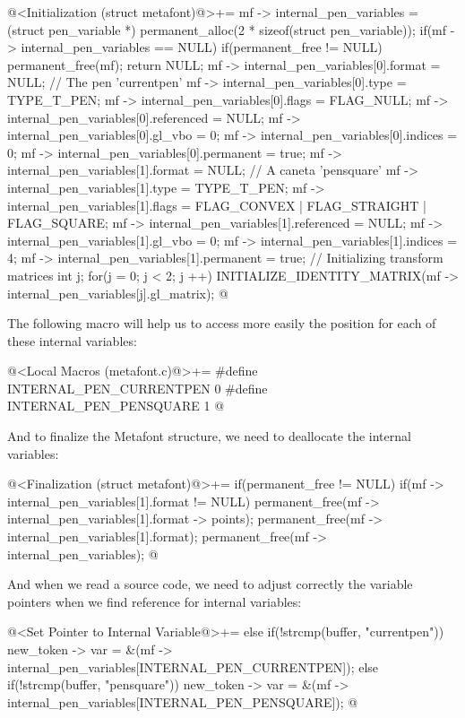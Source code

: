 \iniciocodigo
@<Initialization (struct metafont)@>+=
mf -> internal_pen_variables = (struct pen_variable *)
                                 permanent_alloc(2 * sizeof(struct pen_variable));
if(mf -> internal_pen_variables == NULL){
  if(permanent_free != NULL)
    permanent_free(mf);
  return NULL;
}
mf -> internal_pen_variables[0].format = NULL; // The pen 'currentpen'
mf -> internal_pen_variables[0].type = TYPE_T_PEN;
mf -> internal_pen_variables[0].flags = FLAG_NULL;
mf -> internal_pen_variables[0].referenced = NULL;
mf -> internal_pen_variables[0].gl_vbo = 0;
mf -> internal_pen_variables[0].indices = 0;
mf -> internal_pen_variables[0].permanent = true;
mf -> internal_pen_variables[1].format = NULL; // A caneta 'pensquare'
mf -> internal_pen_variables[1].type = TYPE_T_PEN;
mf -> internal_pen_variables[1].flags = FLAG_CONVEX | FLAG_STRAIGHT |
                                        FLAG_SQUARE;
mf -> internal_pen_variables[1].referenced = NULL;
mf -> internal_pen_variables[1].gl_vbo = 0;
mf -> internal_pen_variables[1].indices = 4;
mf -> internal_pen_variables[1].permanent = true;
{ // Initializing transform matrices
  int j;
  for(j = 0; j < 2; j ++)
    INITIALIZE_IDENTITY_MATRIX(mf -> internal_pen_variables[j].gl_matrix);
}
@
\fimcodigo

The following macro will help us to access more easily the position
for each of these internal variables:

\iniciocodigo
@<Local Macros (metafont.c)@>+=
#define INTERNAL_PEN_CURRENTPEN 0
#define INTERNAL_PEN_PENSQUARE  1
@
\fimcodigo

And to finalize the Metafont structure, we need to deallocate the
internal variables:

\iniciocodigo
@<Finalization (struct metafont)@>+=
if(permanent_free != NULL){
  if(mf -> internal_pen_variables[1].format != NULL){
    permanent_free(mf -> internal_pen_variables[1].format -> points);
    permanent_free(mf -> internal_pen_variables[1].format);
  }
  permanent_free(mf -> internal_pen_variables);
}
@
\fimcodigo

And when we read a source code, we need to adjust correctly the
variable pointers when we find reference for internal variables:


\iniciocodigo
@<Set Pointer to Internal Variable@>+=
else if(!strcmp(buffer, "currentpen"))
  new_token -> var =
          &(mf -> internal_pen_variables[INTERNAL_PEN_CURRENTPEN]);
else if(!strcmp(buffer, "pensquare"))
  new_token -> var =
          &(mf -> internal_pen_variables[INTERNAL_PEN_PENSQUARE]);
@
\fimcodigo

